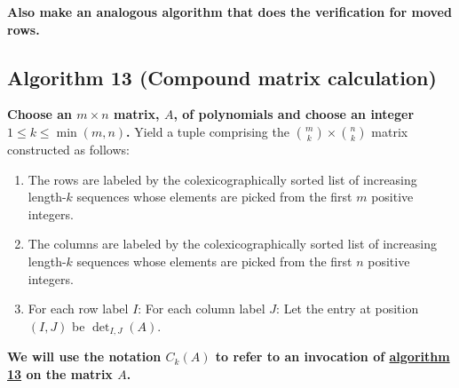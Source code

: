 \documentclass[twocolumn]{article}
\begin{document}
			\textbf{Also make an analogous algorithm that does the verification for moved rows.}
		\subsection{Algorithm 13 (Compound matrix calculation)}\label{sec:algorithm 13}
			\textbf{Choose an $m\times n$ matrix, $A$, of polynomials and choose an integer $1\le k\le\min(m,n)$.} Yield a tuple comprising the $\binom{m}{k}\times\binom{n}{k}$ matrix constructed as follows:
			\begin{enumerate}
				\item The rows are labeled by the colexicographically sorted list of increasing length-$k$ sequences whose elements are picked from the first $m$ positive integers.
				\item The columns are labeled by the colexicographically sorted list of increasing length-$k$ sequences whose elements are picked from the first $n$ positive integers.
				\item For each row label $I$: For each column label $J$: Let the entry at position $(I,J)$ be $\det_{I,J}(A)$.
			\end{enumerate}
			\textbf{We will use the notation $C_k(A)$ to refer to an invocation of \hyperref[sec:algorithm 13]{algorithm 13} on the matrix $A$.}
\end{document}
